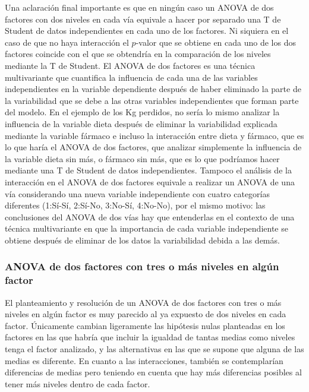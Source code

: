 Una aclaración final importante es que en ningún caso un ANOVA de dos factores con dos niveles en cada vía equivale a hacer por separado una
T de Student de datos independientes en cada uno de los factores. Ni siquiera en el caso de que no haya interacción el $p$-valor que se
obtiene en cada uno de los dos factores coincide con el que se obtendría en la comparación de los niveles mediante la T de Student. El ANOVA
de dos factores es una técnica multivariante que cuantifica la influencia de cada una de las variables independientes en la variable
dependiente después de haber eliminado la parte de la variabilidad que se debe a las otras variables independientes que forman parte del
modelo. En el ejemplo de los Kg perdidos, no sería lo mismo analizar la influencia de la variable dieta después de eliminar la variabilidad
explicada mediante la variable fármaco e incluso la interacción entre dieta y fármaco, que es lo que haría el ANOVA de dos factores, que
analizar simplemente la influencia de la variable dieta sin más, o fármaco sin más, que es lo que podríamos hacer mediante una T de Student
de datos independientes. Tampoco el análisis de la interacción en el ANOVA de dos factores equivale a realizar un ANOVA de una vía
considerando una nueva variable independiente con cuatro categorías diferentes (1:Sí-Sí, 2:Sí-No, 3:No-Sí, 4:No-No), por el mismo motivo:
las conclusiones del ANOVA de dos vías hay que entenderlas en el contexto de una técnica multivariante en que la importancia de cada
variable independiente se obtiene después de eliminar de los datos la variabilidad debida a las demás.


\subsubsection{ANOVA de dos factores con tres o más niveles en algún factor}
El planteamiento y resolución de un ANOVA de dos factores con tres o más niveles en algún factor es muy parecido al ya expuesto de dos
niveles en cada factor. Únicamente cambian ligeramente las hipótesis nulas planteadas en los factores en las que habría que incluir la
igualdad de tantas medias como niveles tenga el factor analizado, y las alternativas en las que se supone que alguna de las medias es
diferente. En cuanto a las interacciones, también se contemplarían diferencias de medias pero teniendo en cuenta que hay más diferencias
posibles al tener más niveles dentro de cada factor.

